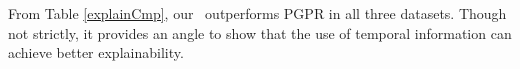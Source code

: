 From Table \ref{explainCmp}, our \tkgrec\ outperforms PGPR in all three datasets. Though not strictly, it provides an angle to show that the use of temporal information can achieve better explainability.





%
%
